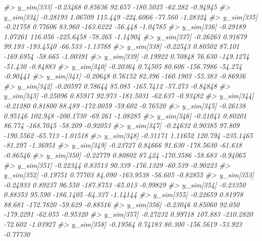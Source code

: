 \documentclass[
  10pt,
  italian,
  a4paper,
  extrafontsizes,onecolumn,openright
  ]{memoir}
\newenvironment{Shaded}{\begin{snugshade}}{\end{snugshade}}
\newcommand{\CommentTok}[1]{\textcolor[rgb]{0.56,0.35,0.01}{\textit{#1}}}
\begin{document}
\begin{Shaded}
\begin{Highlighting}[]
\CommentTok{\#\textgreater{} y\_sim[333] {-}0.23468 0.85636  92.657 {-}180.5025 {-}62.282 {-}0.94945}
\CommentTok{\#\textgreater{} y\_sim[334] {-}0.28193 1.06709 115.449 {-}224.6066 {-}77.560 {-}1.28324}
\CommentTok{\#\textgreater{} y\_sim[335] {-}0.21758 0.77606  83.960 {-}163.6222 {-}56.448 {-}1.04785}
\CommentTok{\#\textgreater{} y\_sim[336] {-}0.29189 1.07261 116.056 {-}225.6458 {-}78.265 {-}1.14904}
\CommentTok{\#\textgreater{} y\_sim[337] {-}0.26263 0.91679  99.193 {-}193.4540 {-}66.533 {-}1.13788}
\CommentTok{\#\textgreater{} y\_sim[338] {-}0.22543 0.80502  87.101 {-}169.6954 {-}58.665 {-}1.00391}
\CommentTok{\#\textgreater{} y\_sim[339] {-}0.19922 0.70848  76.630 {-}149.1274 {-}51.430 {-}0.84883}
\CommentTok{\#\textgreater{} y\_sim[340] {-}0.20364 0.74505  80.606 {-}156.7986 {-}54.274 {-}0.90441}
\CommentTok{\#\textgreater{} y\_sim[341] {-}0.20648 0.76152  82.396 {-}160.1903 {-}55.383 {-}0.86936}
\CommentTok{\#\textgreater{} y\_sim[342] {-}0.20597 0.78644  85.085 {-}165.7412 {-}57.273 {-}0.84848}
\CommentTok{\#\textgreater{} y\_sim[343] {-}0.25096 0.85917  92.973 {-}181.5031 {-}62.637 {-}0.93482}
\CommentTok{\#\textgreater{} y\_sim[344] {-}0.21280 0.81800  88.489 {-}172.0059 {-}59.602 {-}0.76520}
\CommentTok{\#\textgreater{} y\_sim[345] {-}0.26138 0.95146 102.948 {-}200.1730 {-}69.261 {-}1.08285}
\CommentTok{\#\textgreater{} y\_sim[346] {-}0.21041 0.80201  86.774 {-}168.7045 {-}58.209 {-}0.92053}
\CommentTok{\#\textgreater{} y\_sim[347] {-}0.24632 0.90385  97.809 {-}190.5562 {-}65.713 {-}1.01518}
\CommentTok{\#\textgreater{} y\_sim[348] {-}0.31171 1.11652 120.794 {-}235.1465 {-}81.297 {-}1.36951}
\CommentTok{\#\textgreater{} y\_sim[349] {-}0.23727 0.84666  91.630 {-}178.5630 {-}61.618 {-}0.86546}
\CommentTok{\#\textgreater{} y\_sim[350] {-}0.22779 0.80802  87.424 {-}170.3586 {-}58.683 {-}0.94065}
\CommentTok{\#\textgreater{} y\_sim[351] {-}0.22344 0.83513  90.339 {-}176.1329 {-}60.539 {-}0.90223}
\CommentTok{\#\textgreater{} y\_sim[352] {-}0.19751 0.77703  84.090 {-}163.9538 {-}56.605 {-}0.82855}
\CommentTok{\#\textgreater{} y\_sim[353] {-}0.24933 0.89237  96.550 {-}187.8753 {-}65.013 {-}0.99829}
\CommentTok{\#\textgreater{} y\_sim[354] {-}0.23350 0.88353  95.590 {-}186.1405 {-}64.337 {-}1.14144}
\CommentTok{\#\textgreater{} y\_sim[355] {-}0.22659 0.81978  88.681 {-}172.7820 {-}59.629 {-}0.88516}
\CommentTok{\#\textgreater{} y\_sim[356] {-}0.23046 0.85060  92.050 {-}179.2291 {-}62.055 {-}0.95320}
\CommentTok{\#\textgreater{} y\_sim[357] {-}0.27232 0.99718 107.883 {-}210.2820 {-}72.602 {-}1.03927}
\CommentTok{\#\textgreater{} y\_sim[358] {-}0.19564 0.74183  80.300 {-}156.5619 {-}53.923 {-}0.77730}

\end{Highlighting}
\end{Shaded}
\end{document}
